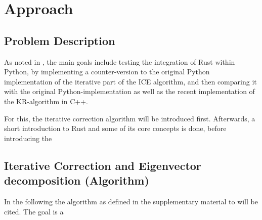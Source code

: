 \chapter{Approach}\label{chap:approach}



\section{Problem Description}\label{sec:problem}



As noted in , the main goals include testing the integration
of Rust within Python, by implementing a counter-version to the original Python
implementation of the iterative part of the ICE algorithm, and then comparing
it with the original Python-implementation as well as the recent implementation
of the KR-algorithm in C++.

For this, the iterative correction algorithm will be introduced first.
Afterwards, a short introduction to Rust and some of its core concepts is done,
before introducing the 





\section{Iterative Correction and Eigenvector decomposition (Algorithm)}\label{sec:ICE}

In the following the algorithm as defined in the supplementary material to
\cite{imakaev2012iterative} will be cited.
The goal is a 




